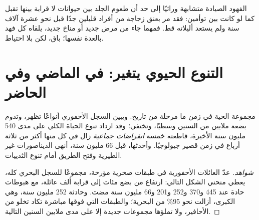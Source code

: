 \begin{example}\label{ex:g10:biodiversity-scales:cheetah}
الفهود الصيادة متشابهة وراثيًا إلى حد أن طعوم الجلد بين حيوانات لا
قرابة بينها تقبل كما لو كانت بين توأمين: فقد مر  بعنق زجاجة من
أفراد قليلين جدًا قبل نحو عشرة آلاف سنة ولم يستعد أليلاته قط. فمهما
جاء من مرض جديد أو مناخ جديد، يلقاه كل فهد بالعدة نفسها؛  باق،
لكن بلا احتياط.
\end{example}

\section{التنوع الحيوي يتغير: في الماضي وفي الحاضر}

\begin{proposition}\label{prop:g10:biodiversity-scales:changes}
مجموعة  الحية في زمن ما مرحلة من تاريخ. ويبين السجل الأحفوري
أنواعًا تظهر، وتدوم بضعة ملايين من السنين وسطيًا، وتختفي؛ وقد ازداد
تنوع الحياة الكلي على مدى 540 مليون سنة الأخيرة، قاطعته خمسة
\emph{انقراضات جماعية} زال في كل منها أكثر من
ثلاثة أرباع  في زمن قصير جيولوجيًا. وأحدثها، قبل 66 مليون سنة،
أنهى الديناصورات غير الطيرية وفتح الطريق أمام تنوع الثدييات.
\end{proposition}
\begin{proof}[شواهد]
عدّ العائلات الأحفورية في طبقات صخرية مؤرخة، مجموعًا للسجل البحري
كله، يعطي منحني الشكل التالي: ارتفاع من بضع مئات إلى قرابة ألف عائلة،
مع هبوطات حادة عند 445 و370 و252 و201 و66 مليون سنة مضت. وحادثة
252 مليون سنة، وهي الكبرى، أزالت نحو 95\% من  البحرية؛
والطبقات التي فوقها مباشرة تكاد تخلو من الأحافير، ولا تملؤها مجموعات
جديدة إلا على مدى ملايين السنين التالية.
\end{proof}

